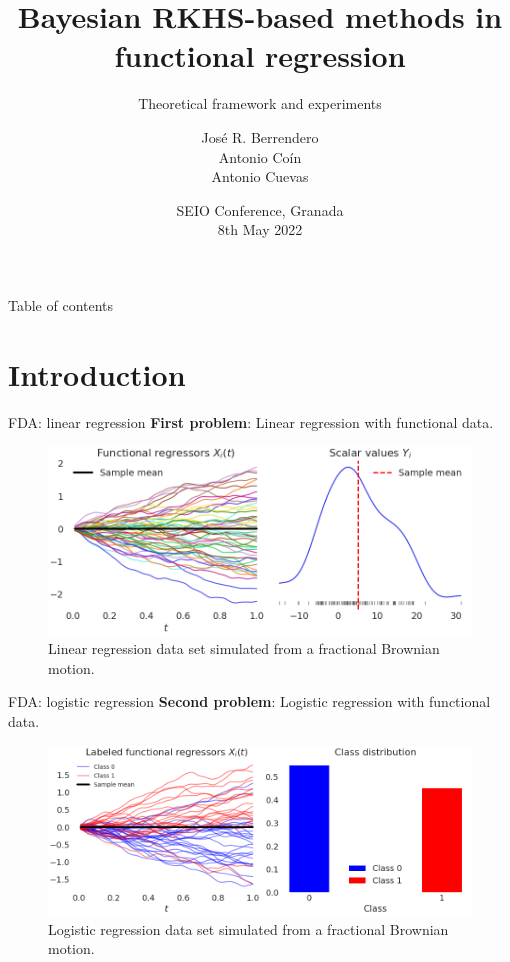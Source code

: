 \documentclass[10pt, english, professionalfonts]{beamer}
\title{Bayesian RKHS-based methods in functional regression}
\subtitle{Theoretical framework and experiments}
\date{SEIO Conference, Granada\\ 8th May 2022\\}
\author{José R. Berrendero \\ Antonio Coín  \\ Antonio Cuevas\\}
\institute{Universidad Autónoma de Madrid \\ \textit{Departamento de Matemáticas}}
\newcommand\maroon[1]{\color{mLightBrown}#1\color{mDarkTeal}}
\begin{document}
\maketitle

\begin{frame}{Table of contents}
  \tableofcontents
\end{frame}

\section{Introduction}

\begin{frame}{FDA: linear regression}
  \textbf{First problem}: \maroon{Linear } regression with functional data.
  \vspace{1em}

\begin{figure}
    \includegraphics[width=\textwidth]{img/data_lin}
    \caption{Linear regression data set simulated from a fractional Brownian motion.}
  \end{figure}
  \vspace{-1em}
\end{frame}
\begin{frame}{FDA: logistic regression}
  \textbf{Second problem}: \maroon{Logistic } regression with functional data.
\vspace{1em}

\begin{figure}
    \includegraphics[width=\textwidth]{img/data_log}
    \caption{Logistic regression data set simulated from a fractional Brownian motion.}
  \end{figure}
  \vspace{-1em}
\end{frame}
\end{document}
